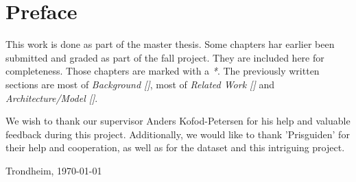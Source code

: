 \section*{Preface}



\vspace{1cm}

This work is done as part of the master thesis. Some chapters har earlier been submitted and graded
as part of the fall project. They are included here for completeness. Those chapters are marked with a \textit{*}.
The previously written sections are most of \textit{Background []}, most of
\textit{Related Work []} and \textit{Architecture/Model []}.

We wish to thank our supervisor Anders Kofod-Petersen for his help and valuable feedback during this project.
Additionally, we would like to thank 'Prisguiden' for their help and cooperation,
as well as for the dataset and this intriguing project.

\vfill

\hfill \thesisAuthor

\hfill Trondheim, \today